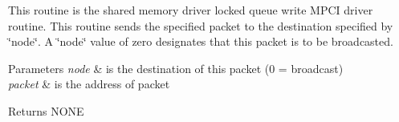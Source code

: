 This routine is the shared memory driver locked queue write M\+P\+CI driver routine. This routine sends the specified packet to the destination specified by \char`\"{}node\char`\"{}. A \char`\"{}node\char`\"{} value of zero designates that this packet is to be broadcasted.


\begin{DoxyParams}{Parameters}
{\em node} & is the destination of this packet (0 = broadcast) \\
\hline
{\em packet} & is the address of packet\\
\hline
\end{DoxyParams}
\begin{DoxyReturn}{Returns}
N\+O\+NE 
\end{DoxyReturn}
